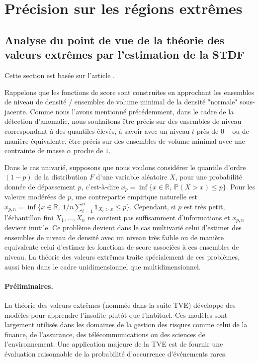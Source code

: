 \documentclass[a4paper, 12pt]{article}
\begin{document}
\section{Précision sur les régions extrêmes}
\label{resume_fr:extreme}
\subsection{Analyse du point de vue de la théorie des valeurs extrêmes par l'estimation de la STDF}
\label{resume_fr:stdf}
Cette section est basée sur l'article \cite{COLT15}.

Rappelons que les fonctions de score sont construites en approchant les ensembles de niveau de densité / ensembles de volume minimal de la densité "normale" sous-jacente. Comme nous l'avons mentionné précédemment, dans le cadre de la détection d'anomalie, nous souhaitons être précis sur des ensembles de niveau correspondant à des quantiles élevés, à savoir avec un niveau $ t $ près de $ 0 $ -- ou de manière équivalente, être précis sur des ensembles de volume minimal avec une contrainte de masse $ \alpha $ proche de $ 1 $.

%
Dans le cas univarié, supposons que nous voulons considérer le quantile d'ordre $(1-p)$ de la distribution $ F $ d'une variable aléatoire $ X $, pour une probabilité donnée de dépassement $ p $, c'est-à-dire
 $x_p = \inf\{x \in \mathbb{R},~ \mathbb{P}(X > x) \le p\}$. 
Pour les valeurs modérées de $ p $, une contrepartie empirique naturelle est
 $x_{p,n} = \inf\{x \in \mathbb{R},~ 1/n \sum_{i=1}^n \mathds{1}_{X_i > x}\le p\}$.
Cependant, si $ p $ est très petit, l'échantillon fini $ X_1, \ldots, X_n $ ne contient pas suffisamment d'informations et $ x_ {p, n} $ devient inutile.
%
Ce problème devient dans le cas multivarié celui d'estimer des ensembles de niveau de densité avec un niveau très faible ou de manière equivalente celui d'estimer les fonctions de score associées à ces ensembles de niveau.
%
La théorie des valeurs extrêmes traite spécialement de ces problèmes, aussi bien dans le cadre unidimensionnel que multidimensionnel.
%


\paragraph{Préliminaires.}
La théorie des valeurs extrêmes (nommée dans la suite \textsc {TVE}) développe des modèles pour apprendre l'insolite plutôt que l'habituel. Ces modèles sont largement utilisés dans les domaines de la gestion des risques comme celui de la finance, de l'assurance, des télécommunications ou des sciences de l'environnement. Une application majeure de la \textsc{TVE} est de fournir une évaluation raisonnable de la probabilité d'occurrence d'événements rares.
\end{document}
